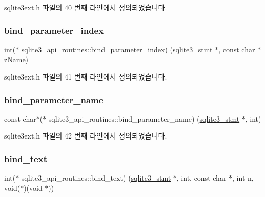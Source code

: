 sqlite3ext.\+h 파일의 40 번째 라인에서 정의되었습니다.

\mbox{\label{structsqlite3__api__routines_af4ade5152fd51b1311463014b48dd05d}} 
\subsubsection{\texorpdfstring{bind\+\_\+parameter\+\_\+index}{bind\_parameter\_index}}
{\footnotesize\ttfamily int($\ast$ sqlite3\+\_\+api\+\_\+routines\+::bind\+\_\+parameter\+\_\+index) (\hyperlink{sqlite3_8h_af2a033da1327cdd77f0a174a09aedd0c}{sqlite3\+\_\+stmt} $\ast$, const char $\ast$z\+Name)}



sqlite3ext.\+h 파일의 41 번째 라인에서 정의되었습니다.

\mbox{\label{structsqlite3__api__routines_a9d8e99fd21fd5929fc6c254060d8f83b}} 
\subsubsection{\texorpdfstring{bind\+\_\+parameter\+\_\+name}{bind\_parameter\_name}}
{\footnotesize\ttfamily const char$\ast$($\ast$ sqlite3\+\_\+api\+\_\+routines\+::bind\+\_\+parameter\+\_\+name) (\hyperlink{sqlite3_8h_af2a033da1327cdd77f0a174a09aedd0c}{sqlite3\+\_\+stmt} $\ast$, int)}



sqlite3ext.\+h 파일의 42 번째 라인에서 정의되었습니다.

\mbox{\label{structsqlite3__api__routines_a0b489499ca3b7e212d25ea8a86d38f0e}} 
\subsubsection{\texorpdfstring{bind\+\_\+text}{bind\_text}}
{\footnotesize\ttfamily int($\ast$ sqlite3\+\_\+api\+\_\+routines\+::bind\+\_\+text) (\hyperlink{sqlite3_8h_af2a033da1327cdd77f0a174a09aedd0c}{sqlite3\+\_\+stmt} $\ast$, int, const char $\ast$, int n, void($\ast$)(void $\ast$))}




